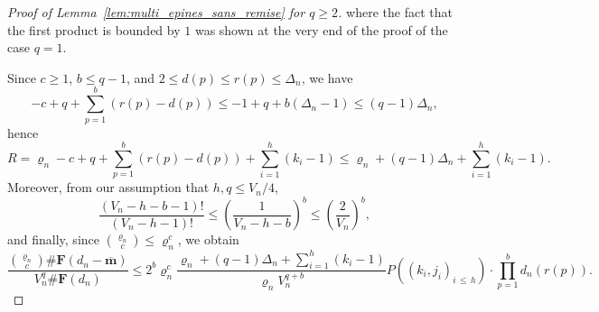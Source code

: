 \documentclass[AHL,Unicode,longabstracts,published]{cedram}
\newcommand{\ensembles}[1]{\mathbf{#1}}
\newcommand{\1}{\ensembles{1}}
\newcommand{\m}{\mathbf{m}}
\renewcommand{\le}{\leqslant}
\renewcommand{\ge}{\geqslant}
\newcommand{\vertices}{V}
\begin{document}
\begin{proof}[Proof of Lemma~\ref{lem:multi_epines_sans_remise} for $q \ge 2$]
where the fact that the first product is bounded by $1$ was shown at the very end of the proof of the case $q=1$.

Since $c \ge 1$, $b \le q-1$, and $2 \le d(p) \le r(p) \le \Delta_n$, we have
\[
- c + q + \sum_{p=1}^b \left(r(p) - d(p)\right)
\le - 1 + q + b \left(\Delta_n-1\right)
\le (q-1) \Delta_n,
\]
hence
\[
R = \varrho_n - c + q + \sum_{p=1}^b \left(r(p) - d(p)\right) + \sum_{i=1}^h \left(k_i - 1\right)
\le \varrho_n + (q-1) \Delta_n + \sum_{i=1}^h \left(k_i - 1\right).
\]
Moreover, from our assumption that $h, q \le \vertices_n/4$,
\[
\frac{(\vertices_n-h-b-1)!}{(\vertices_n - h - 1)!}
\le \left(\frac{1}{\vertices_n - h - b}\right)^b
\le \left(\frac{2}{\vertices_n}\right)^b,
\]
and finally, since $\binom{\varrho_n}{c} \le \varrho_n^c$, we obtain
\[
\frac{\binom{\varrho_n}{c} \#\ensembles{F}\left(d_n - \overline{\m}\right)}{\vertices_n^q \#\ensembles{F}(d_n)}
\le 2^b \varrho_n^c \frac{\varrho_n + (q-1) \Delta_n + \sum_{i=1}^h (k_i - 1)}{\varrho_n \vertices_n^{q+b}} P\left(\left(k_i, j_i\right)_{i\,\le\,h}\right)
\cdot \prod_{p=1}^b d_n(r(p)).
\]



\end{proof}
\end{document}
